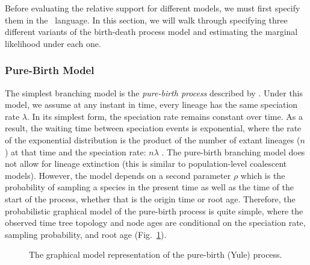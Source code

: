 Before evaluating the relative support for different models, we must first specify them in the \Rev~language.
In this section, we will walk through specifying three different variants of the birth-death process model and estimating the marginal likelihood under each one. 

\bigskip
\subsubsection{Pure-Birth Model}\label{yuleModSec}

The simplest branching model is the \textit{pure-birth process} described by \citet{yule24}. 
Under this model, we assume at any instant in time, every lineage has the same speciation rate $\lambda$.
In its simplest form, the speciation rate remains constant over time. 
As a result, the waiting time between speciation events is exponential, where the rate of the exponential distribution is the product of the number of extant lineages ($n$) at that time and the speciation rate: $n\lambda$ \citep{yule24,aldous01,hartmann10}. 
The pure-birth branching model does not allow for lineage extinction (this is similar to population-level coalescent models). 
However, the model depends on a second parameter $\rho$ which is the probability of sampling a species in the present time as well as the time of the start of the process, whether that is the origin time or root age.
Therefore, the probabilistic graphical model of the pure-birth process is quite simple, where the observed time tree topology and node ages are conditional on the speciation rate, sampling probability, and root age (Fig.~\ref{yuleGMfig}).
\begin{figure}[h!]
\centering
{}
\caption{\small The graphical model representation of the pure-birth (Yule) process.}
\label{yuleGMfig}
\end{figure}

